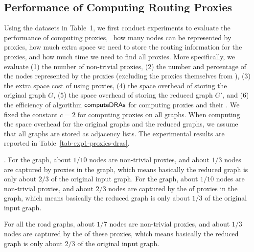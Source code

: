 \subsection{Performance of Computing Routing Proxies}
Using the datasets in Table~1, we first conduct experiments to evaluate the performance of computing proxies, \ie\ how many nodes can be represented by proxies, how much extra space we need to store the routing information for the proxies, and how much time we need to find all proxies. More specifically, we evaluate (1) the number of non-trivial proxies, (2) the number and percentage of the nodes represented by the proxies (excluding the proxies themselves from \dras), (3) the extra space cost of using proxies, (4) the space overhead of storing the original graph $G$, (5) the space overhead of storing the reduced graph $G'$, and (6) the efficiency of algorithm ${\mathsf{computeDRAs}}$ for computing proxies and their \dras. We fixed the constant $c = 2$ for computing proxies on all graphs. When computing the space overhead for the original graphs and the reduced graphs, we assume that all graphs are stored as adjacency lists. The experimental results are reported in Table~\ref{tab-exp1-proxies-dras}.

.
For the \dblp graph, about $1/10$ nodes are non-trivial proxies, and about $1/3$ nodes are captured by proxies in the graph, which means basically the reduced graph is only about $2/3$ of the original input graph. For the \dblpone graph, about $1/10$ nodes are non-trivial proxies, and about $2/3$ nodes are captured by the \dras of proxies in the graph, which means basically the reduced graph is only about $1/3$ of the original input graph.

For all the road graphs,  about $1/7$ nodes are non-trivial proxies, and about $1/3$ nodes are captured by the \dras of these proxies, which means basically the reduced graph is only about $2/3$ of the original input graph.

